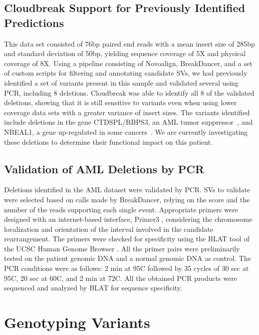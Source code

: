 \subsection{Cloudbreak Support for Previously Identified Predictions}

This data set consisted of 76bp paired end reads with a mean insert size of 285bp and standard deviation of 50bp, yielding sequence coverage of 5X and physical coverage of 8X. Using a pipeline consisting of Novoalign, BreakDancer, and a set of custom scripts for filtering and annotating candidate SVs, we had previously identified a set of variants present in this sample and validated several using PCR, including 8 deletions. Cloudbreak was able to identify all 8 of the validated deletions, showing that it is still sensitive to variants even when using lower coverage data sets with a greater variance of insert sizes. The variants identified include deletions in the gene CTDSPL/RBPS3, an AML tumor suppressor~\cite{Zheng:2012kk}, and NBEAL1, a gene up-regulated in some cancers~\cite{Chen:2004jo}. We are currently investigating these deletions to determine their functional impact on this patient. 

\subsection{Validation of AML Deletions by PCR}

Deletions identified in the AML dataset were validated by PCR. SVs to validate were selected based on calls made by BreakDancer, relying on the score and the number of the reads supporting each single event. Appropriate primers were designed with an internet-based interface, Primer3 \cite{Untergasser01082012}, considering the chromosome localization and orientation of the interval involved in the candidate rearrangement. The primers were checked for specificity using the BLAT tool of the UCSC Human Genome Browser \cite{Kent01042002}. All the primer pairs were preliminarily tested on the patient genomic DNA and a normal genomic DNA as control. The PCR conditions were as follows: 2 min at 95\degree C followed by 35 cycles of 30 sec at 95\degree C, 20 sec at 60\degree C, and 2 min at 72\degree C. All the obtained PCR products were sequenced and analyzed by BLAT for sequence specificity. 

\section{Genotyping Variants}\label{section_genotyping_eval}

